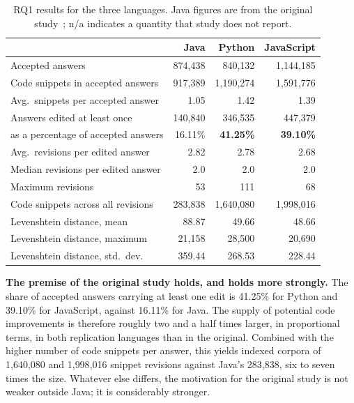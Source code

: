 \documentclass[onecolumn,11pt]{IEEEtran}
\begin{document}
\begin{table}[!t]
\caption{RQ1 results for the three languages. Java figures are from the original
study~\cite{wiratsin2025java}; n/a indicates a quantity that study does not report.}
\label{tab:comparison}
\centering
\begin{tabular}{lrrr}
\toprule
 & Java & Python & JavaScript \\
\midrule
Accepted answers                          & 874{,}438 & 840{,}132 & 1{,}144{,}185 \\
Code snippets in accepted answers         & 917{,}389 & 1{,}190{,}274 & 1{,}591{,}776 \\
Avg.\ snippets per accepted answer        & 1.05 & 1.42 & 1.39 \\
Answers edited at least once              & 140{,}840 & 346{,}535 & 447{,}379 \\
\quad as a percentage of accepted answers & 16.11\% & \textbf{41.25\%} & \textbf{39.10\%} \\
Avg.\ revisions per edited answer         & 2.82 & 2.78 & 2.68 \\
Median revisions per edited answer        & 2.0 & 2.0 & 2.0 \\
Maximum revisions                         & 53 & 111 & 68 \\
Code snippets across all revisions        & 283{,}838 & 1{,}640{,}080 & 1{,}998{,}016 \\
\midrule
Levenshtein distance, mean                & 88.87 & 49.66 & 48.66 \\
Levenshtein distance, maximum             & 21{,}158 & 28{,}500 & 20{,}690 \\
Levenshtein distance, std.\ dev.          & 359.44 & 268.53 & 228.44 \\
\bottomrule
\end{tabular}
\end{table}

\textbf{The premise of the original study holds, and holds more strongly.}
The share of accepted answers carrying at least one edit is 41.25\% for Python and 39.10\% for JavaScript, against 16.11\% for Java.
The supply of potential code improvements is therefore roughly two and a half times larger, in proportional terms, in both replication languages than in the original.
Combined with the higher number of code snippets per answer, this yields indexed corpora of 1{,}640{,}080 and 1{,}998{,}016 snippet revisions against Java's 283{,}838, six to seven times the size.
Whatever else differs, the motivation for the original study is not weaker outside Java; it is considerably stronger.
\end{document}
